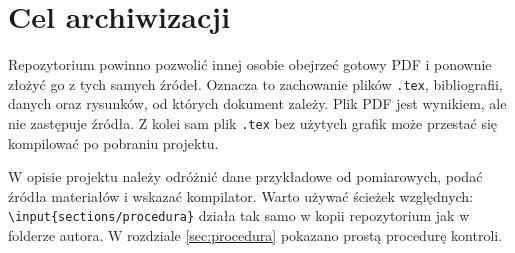 \section{Cel archiwizacji}\label{sec:cel}
Repozytorium powinno pozwolić innej osobie obejrzeć gotowy PDF i
ponownie złożyć go z tych samych źródeł. Oznacza to zachowanie plików
\texttt{.tex}, bibliografii, danych oraz rysunków, od których dokument
zależy. Plik PDF jest wynikiem, ale nie zastępuje źródła. Z kolei sam
plik \texttt{.tex} bez użytych grafik może przestać się kompilować po
pobraniu projektu.

W opisie projektu należy odróżnić dane przykładowe od pomiarowych,
podać źródła materiałów i wskazać kompilator. Warto używać ścieżek
względnych: \texttt{\textbackslash input\{sections/procedura\}} działa
tak samo w kopii repozytorium jak w folderze autora. W rozdziale
\ref{sec:procedura} pokazano prostą procedurę kontroli.
